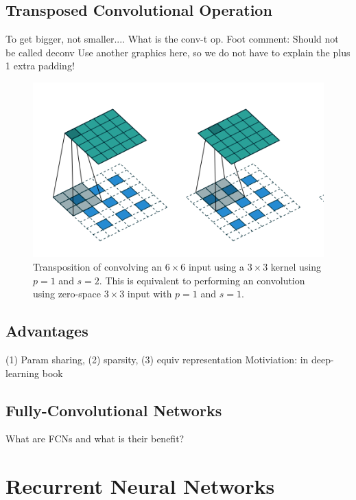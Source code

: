 \subsection{Transposed Convolutional Operation}

To get bigger, not smaller....
What is the conv-t op. Foot comment: Should not be called deconv
Use another graphics here, so we do not have to explain the plus 1 extra padding!


\begin{figure}[htpb]
	\centering
	\includegraphics[scale=0.4]{figures/conv_tp.png}
	\caption[Transposed convolution operation]{Transposition of convolving an $6 \times 6$ input using a $3 \times 3$ kernel using $p=1$ and $s=2$. This is equivalent to performing an convolution using zero-space $3 \times 3$ input with $p=1$ and $s=1$.} \label{fig:conv_tp}
\end{figure}



\subsection{Advantages}

(1) Param sharing, (2) sparsity, (3) equiv  representation
Motiviation: in deep-learning book


\subsection{Fully-Convolutional Networks}

What are FCNs and what is their benefit?


\section{Recurrent Neural Networks}

